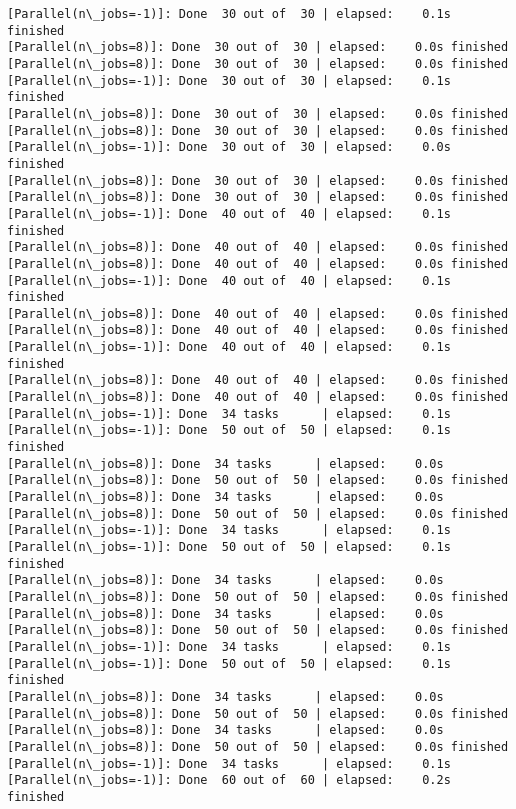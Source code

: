 \documentclass[11pt]{article}
\begin{document}
\begin{Verbatim}[commandchars=\\\{\}]
[Parallel(n\_jobs=-1)]: Done  30 out of  30 | elapsed:    0.1s finished
[Parallel(n\_jobs=8)]: Done  30 out of  30 | elapsed:    0.0s finished
[Parallel(n\_jobs=8)]: Done  30 out of  30 | elapsed:    0.0s finished
[Parallel(n\_jobs=-1)]: Done  30 out of  30 | elapsed:    0.1s finished
[Parallel(n\_jobs=8)]: Done  30 out of  30 | elapsed:    0.0s finished
[Parallel(n\_jobs=8)]: Done  30 out of  30 | elapsed:    0.0s finished
[Parallel(n\_jobs=-1)]: Done  30 out of  30 | elapsed:    0.0s finished
[Parallel(n\_jobs=8)]: Done  30 out of  30 | elapsed:    0.0s finished
[Parallel(n\_jobs=8)]: Done  30 out of  30 | elapsed:    0.0s finished
[Parallel(n\_jobs=-1)]: Done  40 out of  40 | elapsed:    0.1s finished
[Parallel(n\_jobs=8)]: Done  40 out of  40 | elapsed:    0.0s finished
[Parallel(n\_jobs=8)]: Done  40 out of  40 | elapsed:    0.0s finished
[Parallel(n\_jobs=-1)]: Done  40 out of  40 | elapsed:    0.1s finished
[Parallel(n\_jobs=8)]: Done  40 out of  40 | elapsed:    0.0s finished
[Parallel(n\_jobs=8)]: Done  40 out of  40 | elapsed:    0.0s finished
[Parallel(n\_jobs=-1)]: Done  40 out of  40 | elapsed:    0.1s finished
[Parallel(n\_jobs=8)]: Done  40 out of  40 | elapsed:    0.0s finished
[Parallel(n\_jobs=8)]: Done  40 out of  40 | elapsed:    0.0s finished
[Parallel(n\_jobs=-1)]: Done  34 tasks      | elapsed:    0.1s
[Parallel(n\_jobs=-1)]: Done  50 out of  50 | elapsed:    0.1s finished
[Parallel(n\_jobs=8)]: Done  34 tasks      | elapsed:    0.0s
[Parallel(n\_jobs=8)]: Done  50 out of  50 | elapsed:    0.0s finished
[Parallel(n\_jobs=8)]: Done  34 tasks      | elapsed:    0.0s
[Parallel(n\_jobs=8)]: Done  50 out of  50 | elapsed:    0.0s finished
[Parallel(n\_jobs=-1)]: Done  34 tasks      | elapsed:    0.1s
[Parallel(n\_jobs=-1)]: Done  50 out of  50 | elapsed:    0.1s finished
[Parallel(n\_jobs=8)]: Done  34 tasks      | elapsed:    0.0s
[Parallel(n\_jobs=8)]: Done  50 out of  50 | elapsed:    0.0s finished
[Parallel(n\_jobs=8)]: Done  34 tasks      | elapsed:    0.0s
[Parallel(n\_jobs=8)]: Done  50 out of  50 | elapsed:    0.0s finished
[Parallel(n\_jobs=-1)]: Done  34 tasks      | elapsed:    0.1s
[Parallel(n\_jobs=-1)]: Done  50 out of  50 | elapsed:    0.1s finished
[Parallel(n\_jobs=8)]: Done  34 tasks      | elapsed:    0.0s
[Parallel(n\_jobs=8)]: Done  50 out of  50 | elapsed:    0.0s finished
[Parallel(n\_jobs=8)]: Done  34 tasks      | elapsed:    0.0s
[Parallel(n\_jobs=8)]: Done  50 out of  50 | elapsed:    0.0s finished
[Parallel(n\_jobs=-1)]: Done  34 tasks      | elapsed:    0.1s
[Parallel(n\_jobs=-1)]: Done  60 out of  60 | elapsed:    0.2s finished

\end{Verbatim}
\end{document}
